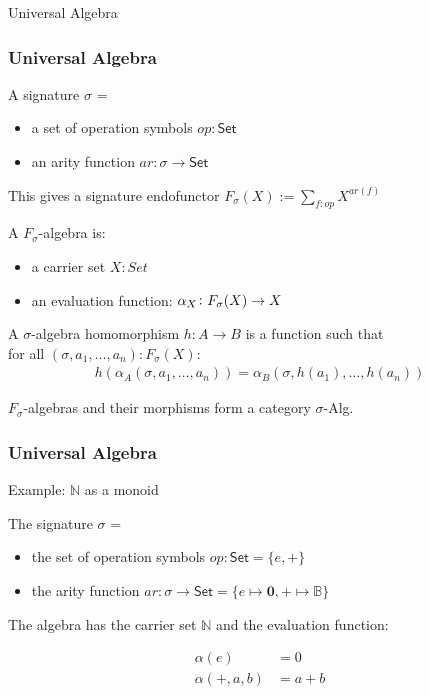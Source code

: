 \documentclass[9pt]{beamer}
\begin{document}
\begin{frame}{Universal Algebra}
\frametitle{Universal Algebra}
A \alert{signature} $\sigma$ =
\begin{itemize}
    \item a set of \alert{operation symbols} $op : \mathsf{Set}$
    \item an \alert{arity function} $ar : \sigma \rightarrow \mathsf{Set}$
\end{itemize}

This gives a signature endofunctor $F_{\sigma}(X) := \sum_{f : op} X^{ar(f)}$

A $F_{\sigma}$-algebra is:
\begin{itemize}
    \item a \alert{carrier set} $X : Set$
    \item an \alert{evaluation function}: $\alpha_X\colon\Sig(X) \to X$
\end{itemize}

A $\sigma$-algebra homomorphism $h: A \rightarrow B$ is a function such that \\
for all $(\sigma, a_1, \dots, a_n) : F_{\sigma}(X)$:
\begin{align*}
    h(\alpha_A(\sigma, a_1, \dots, a_n)) = \alpha_B(\sigma, h(a_1), \dots, h(a_n))
\end{align*}

$F_{\sigma}$-algebras and their morphisms form a category $\sigma$-Alg.

\end{frame}

\begin{frame}
\frametitle{Universal Algebra}
Example: $\mathbb{N}$ as a monoid

The signature $\sigma$ =
\begin{itemize}
    \item the set of operation symbols $op : \mathsf{Set} = \{e, +\}$
    \item the arity function $ar : \sigma \rightarrow \mathsf{Set} = \{e \mapsto \mathbf{0}, + \mapsto \mathbb{B}\}$
\end{itemize}

The algebra has the carrier set $\mathbb{N}$ and the evaluation function:

\begin{align*}
\alpha(e) & = 0 \\
\alpha(+, a, b) & = a + b 
\end{align*} 


\end{frame}
\end{document}
